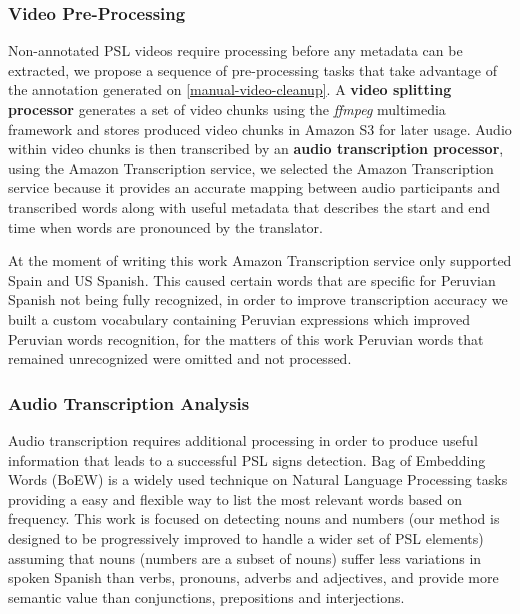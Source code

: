\documentclass[twocolumn,conference]{article}
\begin{document}
\subsubsection{Video Pre-Processing}\label{video-pre-processing}
Non-annotated PSL videos require processing before any metadata can be extracted, we propose a sequence of pre-processing tasks that take advantage of the annotation generated on \ref{manual-video-cleanup}. A \textbf{video splitting processor} generates a set of video chunks using the \textit{ffmpeg} multimedia framework and stores produced video chunks in Amazon S3 for later usage. Audio within video chunks is then transcribed by an \textbf{audio transcription processor}, using the Amazon Transcription service, we selected the Amazon Transcription service because it provides an accurate mapping between audio participants and transcribed words along with useful metadata that describes the start and end time when words are pronounced by the translator. 

At the moment of writing this work Amazon Transcription service only supported Spain and US Spanish. This caused certain words that are specific for Peruvian Spanish not being fully recognized, in order to improve transcription accuracy we built a custom vocabulary containing Peruvian expressions which improved  Peruvian words recognition, for the matters of this work Peruvian words that remained unrecognized were omitted and not processed.

\subsubsection{Audio Transcription Analysis}\label{audio-transcription-analysis}
Audio transcription requires additional processing in order to produce useful information that leads to a successful PSL signs detection. Bag of Embedding Words (BoEW) is a widely used technique on Natural Language Processing tasks providing a easy and flexible way to list the most relevant words based on frequency. This work is focused on detecting nouns and numbers (our method is designed to be progressively improved to handle a wider set of PSL elements) assuming that nouns (numbers are a subset of nouns) suffer less variations in spoken Spanish than verbs, pronouns, adverbs and adjectives, and provide more semantic value than conjunctions, prepositions and interjections. 
\end{document}
